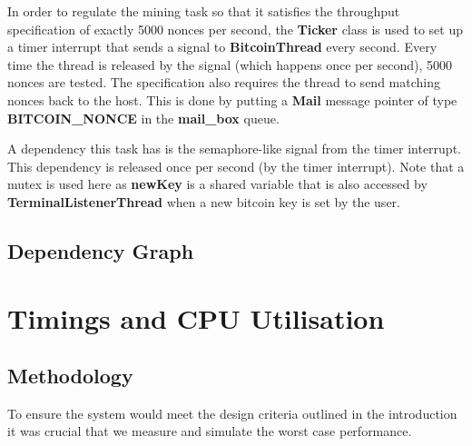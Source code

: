 \documentclass{article}
\begin{document}
\bigskip

In order to regulate the mining task so that it satisfies the throughput specification of exactly 5000 nonces per second, the \textbf{Ticker} class is used to set up a timer interrupt that sends a signal to \textbf{BitcoinThread} every second. Every time the thread is released by the signal (which happens once per second), 5000 nonces are tested. The specification also requires the thread to send matching nonces back to the host. This is done by putting a \textbf{Mail} message pointer of type \textbf{BITCOIN\_NONCE} in the \textbf{mail\_box} queue. 

\bigskip



\bigskip

A dependency this task has is the semaphore-like signal from the timer interrupt. This dependency is released once per second (by the timer interrupt). Note that a mutex is used here as \textbf{newKey} is a shared variable that is also accessed by \textbf{TerminalListenerThread} when a new bitcoin key is set by the user. 


\subsection{Dependency Graph}



\section{Timings and CPU Utilisation}
\subsection{Methodology}
To ensure the system would meet the design criteria outlined in the introduction it was crucial that we measure and simulate the worst case performance. 
\end{document}
